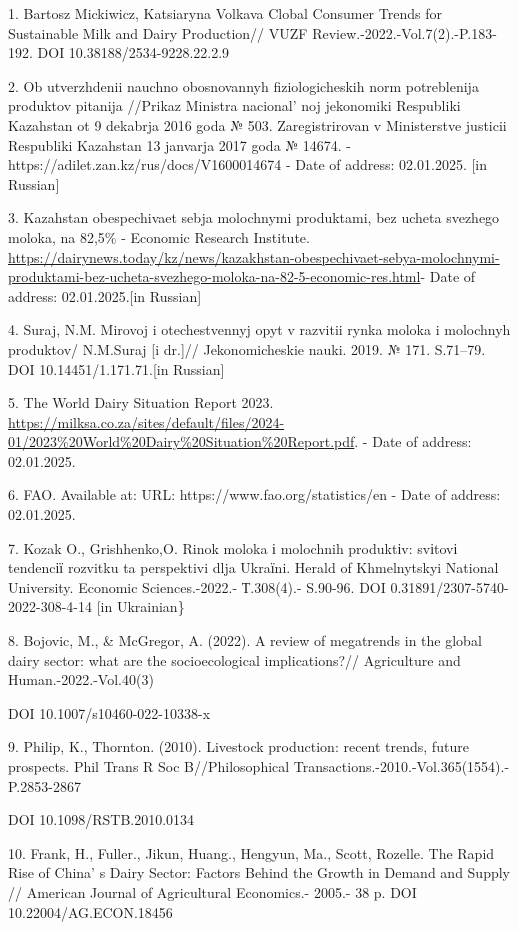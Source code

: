 \begin{references}
1. Bartosz Mickiwicz, Katsiaryna Volkava Clobal Consumer Trends for
Sustainable Milk and Dairy Production// VUZF
Review.-2022.-Vol.7(2).-P.183-192. DOI 10.38188/2534-9228.22.2.9

2. Ob utverzhdenii nauchno obosnovannyh fiziologicheskih norm
potreblenija produktov pitanija //Prikaz Ministra
nacional' noj jekonomiki Respubliki Kazahstan ot 9
dekabrja 2016 goda № 503. Zaregistrirovan v Ministerstve justicii
Respubliki Kazahstan 13 janvarja 2017 goda № 14674. -
https://adilet.zan.kz/rus/docs/V1600014674 - Date of address:
02.01.2025. {[}in Russian{]}

3. Kazahstan obespechivaet sebja molochnymi produktami, bez ucheta
svezhego moloka, na 82,5\% - Economic Research Institute.
\url{https://dairynews.today/kz/news/kazakhstan-obespechivaet-sebya-molochnymi-produktami-bez-ucheta-svezhego-moloka-na-82-5-economic-res.html}-
Date of address: 02.01.2025.{[}in Russian{]}

4. Suraj, N.M. Mirovoj i otechestvennyj opyt v razvitii rynka moloka i
molochnyh produktov/ N.M.Suraj {[}i dr.{]}// Jekonomicheskie nauki.
2019. № 171. S.71--79. DOI 10.14451/1.171.71.{[}in Russian{]}

5. The World Dairy Situation Report 2023.
\url{https://milksa.co.za/sites/default/files/2024-01/2023\%20World\%20Dairy\%20Situation\%20Report.pdf}.
- Date of address: 02.01.2025.

6. FAO. Available at: URL: https://www.fao.org/statistics/en - Date of
address: 02.01.2025.

7. Kozak O., Grishhenko,O. Rinok moloka і molochnih produktіv: svіtovі
tendencії rozvitku ta perspektivi dlja Ukraїni. Herald of Khmelnytskyi
National University. Economic Sciences.-2022.- Т.308(4).- S.90-96. DOI
0.31891/2307-5740-2022-308-4-14 {[}in Ukrainian\}

8. Bojovic, M., \& McGregor, A. (2022). A review of megatrends in the
global dairy sector: what are the socioecological implications?//
Agriculture and Human.-2022.-Vol.40(3)

DOI 10.1007/s10460-022-10338-x

9. Philip, K., Thornton. (2010). Livestock production: recent trends,
future prospects. Phil Trans R Soc B//Philosophical
Transactions.-2010.-Vol.365(1554).-P.2853-2867

DOI 10.1098/RSTB.2010.0134

10. Frank, H., Fuller., Jikun, Huang., Hengyun, Ma., Scott, Rozelle. The
Rapid Rise of China' s Dairy Sector: Factors Behind the
Growth in Demand and Supply // American Journal of Agricultural
Economics.- 2005.- 38 p. DOI 10.22004/AG.ECON.18456


\end{references}
